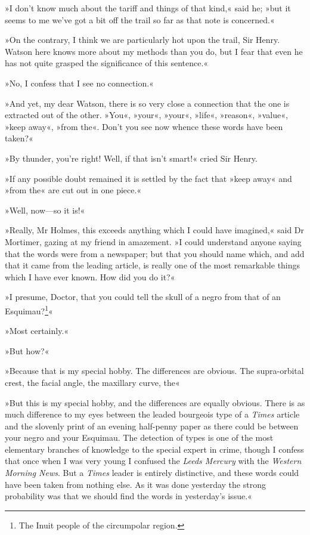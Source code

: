 »I don't know much about the tariff and things of that kind,« said he; »but it seems to me we've got a bit off the trail so far as that note is concerned.«

»On the contrary, I think we are particularly hot upon the trail, Sir Henry. Watson here knows more about my methods than you do, but I fear that even he has not quite grasped the significance of this sentence.«

»No, I confess that I see no connection.«

»And yet, my dear Watson, there is so very close a connection that the one is extracted out of the other. »You«, »your«, »your«, »life«, »reason«, »value«, »keep away«, »from the«. Don't you see now whence these words have been taken?«

»By thunder, you're right! Well, if that isn't smart!« cried Sir Henry.

»If any possible doubt remained it is settled by the fact that »keep away« and »from the« are cut out in one piece.«

»Well, now—so it is!«

»Really, Mr Holmes, this exceeds anything which I could have imagined,« said Dr Mortimer, gazing at my friend in amazement. »I could understand anyone saying that the words were from a newspaper; but that you should name which, and add that it came from the leading article, is really one of the most remarkable things which I have ever known. How did you do it?«

»I presume, Doctor, that you could tell the skull of a negro from that of an Esquimau?\footnote{The Inuit people of the circumpolar region.}«

»Most certainly.«

»But how?«

»Because that is my special hobby. The differences are obvious. The supra-orbital crest, the facial angle, the maxillary curve, the\longdash«

»But this is my special hobby, and the differences are equally obvious. There is as much difference to my eyes between the leaded bourgeois type of a \textit{Times} article and the slovenly print of an evening half-penny paper as there could be between your negro and your Esquimau. The detection of types is one of the most elementary branches of knowledge to the special expert in crime, though I confess that once when I was very young I confused the \textit{Leeds Mercury} with the \textit{Western Morning News}. But a \textit{Times} leader is entirely distinctive, and these words could have been taken from nothing else. As it was done yesterday the strong probability was that we should find the words in yesterday's issue.«

